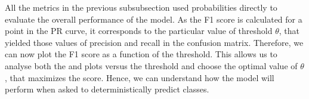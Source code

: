All the metrics in the previous subsubsection used probabilities directly to evaluate the overall performance of the model.
As the F1 score is calculated for a point in the PR curve, it corresponds to the particular value of threshold $\theta$, that yielded those values of precision and recall in the confusion matrix.
Therefore, we can now plot the F1 score as a function of the threshold. 
This allows us to analyse both the \posF and \negF plots versus the threshold and choose the optimal value of $\theta$, that maximizes the \macroF score.
Hence, we can understand how the model will perform when asked to deterministically predict classes.

